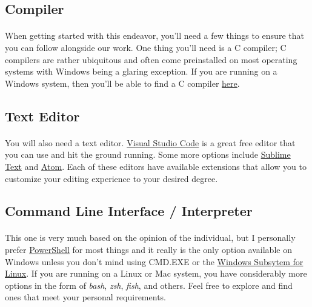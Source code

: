    \subsection{Compiler}
   \paragraph{}
      When getting started with this endeavor, you'll need a few things to ensure that you can follow alongside our work. One thing you'll need is a C
      compiler; C compilers are rather ubiquitous and often come preinstalled on most operating systems with Windows being a glaring exception. If you
      are running on a Windows system, then you'll be able to find a C compiler \href{https://github.com/llvm/llvm-project/releases/download/llvmorg-12.0.1/LLVM-12.0.1-win64.exe}{here}.

   \subsection{Text Editor}
   \paragraph{}
      You will also need a text editor. \href{https://code.visualstudio.com}{Visual Studio Code} is a great free editor that you can use and hit the
      ground running. Some more options include \href{https://sublimetext.com}{Sublime Text} and \href{https://atom.io}{Atom}. Each of these editors have
      available extensions that allow you to customize your editing experience to your desired degree.

   \subsection{Command Line Interface / Interpreter}
   \paragraph{}
      This one is very much based on the opinion of the individual, but I personally prefer \href{https://docs.microsoft.com/en-us/powershell}{PowerShell} for most things and it really is the only option
      available on Windows unless you don't mind using CMD.EXE or the \href{https://docs.microsoft.com/en-us/windows/wsl/about}{Windows Subsytem for Linux}.
      If you are running on a Linux or Mac system, you have considerably more options in the form of \textit{bash}, \textit{zsh}, \textit{fish}, and others.
      Feel free to explore and find ones that meet your personal requirements.


